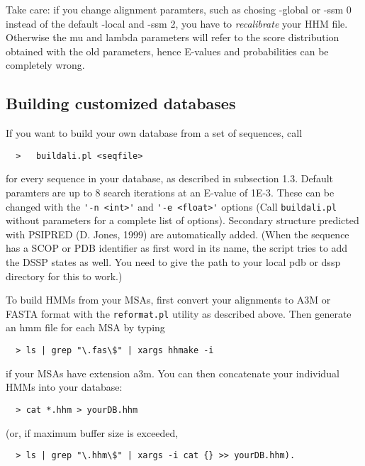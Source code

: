 \documentclass[11pt,a4paper]{article}
\begin{document}
Take care: if you change alignment paramters, such as chosing -global or -ssm 0 
instead of the default -local and -ssm 2, you have to \emph{recalibrate} your HHM file. 
Otherwise the mu and lambda parameters will refer to the score distribution obtained
with the old parameters, hence E-values and probabilities can be completely wrong.

\subsection{Building customized databases}

If you want to build your own database from a set of sequences, call 
\begin{verbatim}
  >   buildali.pl <seqfile>
\end{verbatim}

for every sequence in your database, as described in subsection 1.3. Default paramters 
are up to 8 search iterations at an E-value of 1E-3. These can be changed with the 
\verb`'-n <int>'` and \verb`'-e <float>'` options (Call \verb`buildali.pl` without parameters for a 
complete list of options). Secondary structure predicted with PSIPRED (D. Jones, 1999) 
are automatically added. (When the sequence has a SCOP or PDB identifier as first word 
in its name, the script tries to add the DSSP states as well. You need to give the 
path to your local pdb or dssp directory for this to work.)

To build HMMs from your MSAs, first convert your alignments to A3M or FASTA 
format with the \verb`reformat.pl` utility as described above. Then generate an hmm file for 
each MSA by typing
\begin{verbatim}
  > ls | grep "\.fas\$" | xargs hhmake -i 
\end{verbatim}

if your MSAs have extension a3m. You can then concatenate your individual HMMs
into your database:
\begin{verbatim}
  > cat *.hhm > yourDB.hhm
\end{verbatim}
(or, if maximum buffer size is exceeded, 
\begin{verbatim}
  > ls | grep "\.hhm\$" | xargs -i cat {} >> yourDB.hhm).
\end{verbatim}
\end{document}
